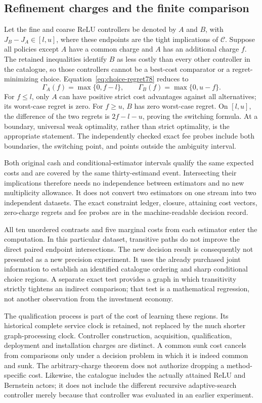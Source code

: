 \subsection{Refinement charges and the finite comparison}
Let the fine and coarse ReLU controllers be denoted by $A$ and $B$, with $J_B-J_A\in[l,u]$, where these endpoints are the tight implications of $\mathcal C$. Suppose all policies except $A$ have a common charge and $A$ has an additional charge $f$. The retained inequalities identify $B$ as less costly than every other controller in the catalogue, so those controllers cannot be a best-cost comparator or a regret-minimizing choice. Equation~\eqref{eq:choice-regret78} reduces to
\[
 \Gamma_A(f)=\max\{0,f-l\},\qquad
 \Gamma_B(f)=\max\{0,u-f\}.
\]
For $f\le l$, only $A$ can have positive strict cost advantages against all alternatives; its worst-case regret is zero. For $f\ge u$, $B$ has zero worst-case regret. On $[l,u]$, the difference of the two regrets is $2f-l-u$, proving the switching formula. At a boundary, universal weak optimality, rather than strict optimality, is the appropriate statement. The independently checked exact fee probes include both boundaries, the switching point, and points outside the ambiguity interval.




Both original cash and conditional-estimator intervals qualify the same expected costs and are covered by the same thirty-estimand event. Intersecting their implications therefore needs no independence between estimators and no new multiplicity allowance. It does not convert two estimators on one stream into two independent datasets. The exact constraint ledger, closure, attaining cost vectors, zero-charge regrets and fee probes are in the machine-readable decision record.

All ten unordered contrasts and five marginal costs from each estimator enter the computation. In this particular dataset, transitive paths do not improve the direct paired endpoint intersections. The new decision result is consequently not presented as a new precision experiment. It uses the already purchased joint information to establish an identified catalogue ordering and sharp conditional choice regions. A separate exact test provides a graph in which transitivity strictly tightens an indirect comparison; that test is a mathematical regression, not another observation from the investment economy.

The qualification process is part of the cost of learning these regions. Its historical complete service clock is retained, not replaced by the much shorter graph-processing clock. Controller construction, acquisition, qualification, deployment and installation charges are distinct. A common sunk cost cancels from comparisons only under a decision problem in which it is indeed common and sunk. The arbitrary-charge theorem does not authorize dropping a method-specific cost. Likewise, the catalogue includes the actually attained ReLU and Bernstein actors; it does not include the different recursive adaptive-search controller merely because that controller was evaluated in an earlier experiment.
